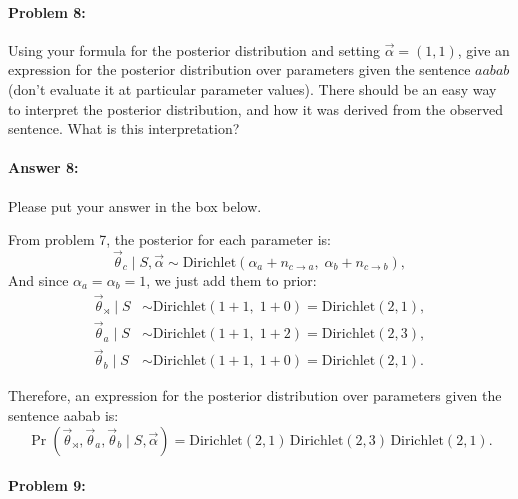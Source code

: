 \documentclass[10pt]{article}
\newenvironment{AnswerBox}{\begin{mdframed}[style=simple]}{\end{mdframed}}
\begin{document}
\hrulefill %

\paragraph{Problem 8:}

Using your formula for the posterior distribution and setting
$\vec{\alpha} = (1,1)$, give an expression for the posterior
distribution over parameters given the sentence $aabab$
(don't evaluate it at particular parameter values).
There should be an easy way to interpret the posterior distribution, and how it was
derived from the observed sentence. What is this interpretation?

\paragraph{Answer 8:} Please put your answer in the box below.


\begin{AnswerBox}%

    
    From problem 7, the posterior for each parameter is:
    \[
    \vec\theta_c \mid S,\vec\alpha
    \sim \text{Dirichlet}(\alpha_a + n_{c\to a},\; \alpha_b + n_{c\to b}),
    \]
    And since $\alpha_a=\alpha_b=1$, we just add them to prior:
    \[
    \begin{aligned}
    \vec\theta_{\rtimes} \mid S &\sim \text{Dirichlet}(1+1,\; 1+0)
    = \text{Dirichlet}(2,1),\\[6pt]
    \vec\theta_{a} \mid S &\sim \text{Dirichlet}(1+1,\; 1+2)
    = \text{Dirichlet}(2,3),\\[6pt]
    \vec\theta_{b} \mid S &\sim \text{Dirichlet}(1+1,\; 1+0)
    = \text{Dirichlet}(2,1).
    \end{aligned}
    \]
    
    Therefore, an expression for the posterior distribution over parameters given the sentence aabab is:
    \[
    \Pr(\vec\theta_{\rtimes},\vec\theta_a,\vec\theta_b \mid S,\vec\alpha)
    =
    \text{Dirichlet}(2,1)\, \text{Dirichlet}(2,3)\, \text{Dirichlet}(2,1).
    \]
    
    
\end{AnswerBox}%


\hrulefill %

\paragraph{Problem 9:}
\end{document}
